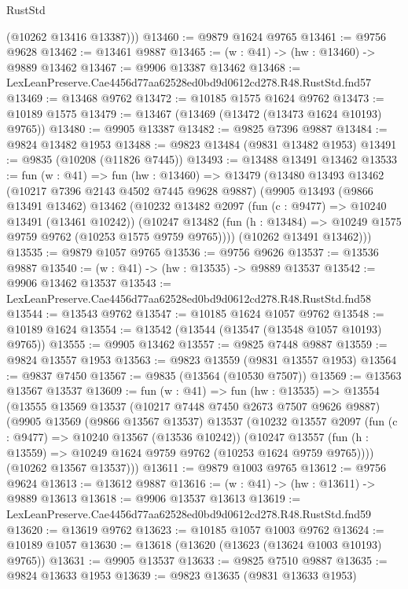 \begin{lexlean}{RustStd}
\begin{coremodule}
        (@10262 @13416 @13387)))
@13460 := @9879 @1624 @9765
@13461 := @9756 @9628
@13462 := @13461 @9887
@13465 := (w : @41) -> (hw : @13460) -> @9889 @13462
@13467 := @9906 @13387 @13462
@13468 := LexLeanPreserve.Cae4456d77aa62528ed0bd9d0612cd278.R48.RustStd.fnd57
@13469 := @13468 @9762
@13472 := @10185 @1575 @1624 @9762
@13473 := @10189 @1575
@13479 := @13467 (@13469 (@13472 (@13473 @1624 @10193) @9765))
@13480 := @9905 @13387
@13482 := @9825 @7396 @9887
@13484 := @9824 @13482 @1953
@13488 := @9823 @13484 (@9831 @13482 @1953)
@13491 := @9835 (@10208 (@11826 @7445))
@13493 := @13488 @13491 @13462
@13533 := fun (w : @41) =>
  fun (hw : @13460) =>
  @13479
    (@13480
      @13493
      @13462
      (@10217 @7396 @2143 @4502 @7445 @9628 @9887)
      (@9905
        @13493
        (@9866 @13491 @13462)
        @13462
        (@10232
          @13482
          @2097
          (fun (c : @9477) => @10240 @13491 (@13461 @10242))
          (@10247 @13482 (fun (h : @13484) => @10249 @1575 @9759 @9762 (@10253 @1575 @9759 @9765))))
        (@10262 @13491 @13462)))
@13535 := @9879 @1057 @9765
@13536 := @9756 @9626
@13537 := @13536 @9887
@13540 := (w : @41) -> (hw : @13535) -> @9889 @13537
@13542 := @9906 @13462 @13537
@13543 := LexLeanPreserve.Cae4456d77aa62528ed0bd9d0612cd278.R48.RustStd.fnd58
@13544 := @13543 @9762
@13547 := @10185 @1624 @1057 @9762
@13548 := @10189 @1624
@13554 := @13542 (@13544 (@13547 (@13548 @1057 @10193) @9765))
@13555 := @9905 @13462
@13557 := @9825 @7448 @9887
@13559 := @9824 @13557 @1953
@13563 := @9823 @13559 (@9831 @13557 @1953)
@13564 := @9837 @7450
@13567 := @9835 (@13564 (@10530 @7507))
@13569 := @13563 @13567 @13537
@13609 := fun (w : @41) =>
  fun (hw : @13535) =>
  @13554
    (@13555
      @13569
      @13537
      (@10217 @7448 @7450 @2673 @7507 @9626 @9887)
      (@9905
        @13569
        (@9866 @13567 @13537)
        @13537
        (@10232
          @13557
          @2097
          (fun (c : @9477) => @10240 @13567 (@13536 @10242))
          (@10247 @13557 (fun (h : @13559) => @10249 @1624 @9759 @9762 (@10253 @1624 @9759 @9765))))
        (@10262 @13567 @13537)))
@13611 := @9879 @1003 @9765
@13612 := @9756 @9624
@13613 := @13612 @9887
@13616 := (w : @41) -> (hw : @13611) -> @9889 @13613
@13618 := @9906 @13537 @13613
@13619 := LexLeanPreserve.Cae4456d77aa62528ed0bd9d0612cd278.R48.RustStd.fnd59
@13620 := @13619 @9762
@13623 := @10185 @1057 @1003 @9762
@13624 := @10189 @1057
@13630 := @13618 (@13620 (@13623 (@13624 @1003 @10193) @9765))
@13631 := @9905 @13537
@13633 := @9825 @7510 @9887
@13635 := @9824 @13633 @1953
@13639 := @9823 @13635 (@9831 @13633 @1953)

\end{coremodule}
\end{lexlean}
